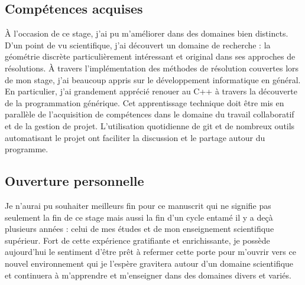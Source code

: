 \subsection{Compétences acquises}

À l'occasion de ce stage, j'ai pu m'améliorer dans des domaines bien distincts. D'un point de vu scientifique, j'ai découvert un domaine de recherche : la géométrie discrète particulièrement intéressant et original dans ses approches de résolutions. À travers l'implémentation des méthodes de résolution couvertes lors de mon stage, j'ai beaucoup appris sur le développement informatique en général. En particulier, j'ai grandement apprécié renouer au C++ à travers la découverte de la programmation générique. Cet apprentissage technique doit être mis en parallèle de l’acquisition de compétences dans le domaine du travail collaboratif et de la gestion de projet. L'utilisation quotidienne de git et de nombreux outils automatisant le projet ont faciliter la discussion et le partage autour du programme.

\subsection{Ouverture personnelle}

Je n'aurai pu souhaiter meilleurs fin pour ce manuscrit qui ne signifie pas seulement la fin de ce stage mais aussi la fin d'un cycle entamé il y a deçà plusieurs années : celui de mes études et de mon enseignement scientifique supérieur. Fort de cette expérience gratifiante et enrichissante, je possède aujourd'hui le sentiment d'être prêt à refermer cette porte pour m'ouvrir vers ce nouvel environnement qui je l'espère gravitera autour d'un domaine scientifique et continuera à m'apprendre et m'enseigner dans des domaines divers et variés.


